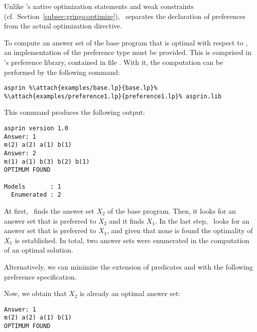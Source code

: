 \begin{example}
\begin{note}
Unlike \gringo's native optimization statements and weak constraints (cf.\ Section~\ref{subsec:gringo:optimize}),
\asprin\ separates the declaration of preferences from the actual optimization directive.
\end{note}

To compute an answer set of the base program that is optimal with respect to , 
an implementation of the preference type  must be provided.
This is comprised in \asprin's preference library,
contained in file .
With it, the computation can be performed by the following command:
%
%
\begin{lstlisting}[numbers=none,escapechar=\%]
asprin %\attach{examples/base.lp}{base.lp}% %\attach{examples/preference1.lp}{preference1.lp}% asprin.lib
\end{lstlisting}
%
This command produces the following output:
%
\begin{lstlisting}[numbers=none]
asprin version 1.0
Answer: 1
m(2) a(2) a(1) b(1)
Answer: 2
m(1) a(1) b(3) b(2) b(1)
OPTIMUM FOUND

Models       : 1
  Enumerated : 2

\end{lstlisting}
%
At first, \asprin\ finds the answer set $X_2$ of the base program. 
Then, it looks for an answer set that is preferred to $X_2$ and it finds $X_1$. 
In the last step, \asprin\ looks for an answer set that is preferred to $X_1$,  
and given that none is found the optimality of $X_1$ is established. 
In total, two answer sets were enumerated in the computation of an optimal solution.

Alternatively,
we can minimize the extension of predicates  and  with the following preference specification.
%

%
Now, we obtain that $X_2$ is already an optimal answer set: 
\begin{lstlisting}[numbers=none]
Answer: 1
m(2) a(2) a(1) b(1)
OPTIMUM FOUND
\end{lstlisting}
\end{example}

